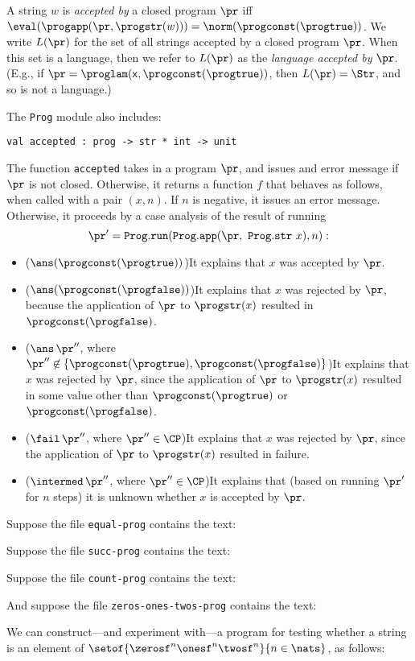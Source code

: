 A string $w$ is \emph{accepted by} a closed program $\pr$ iff
$\eval(\progapp(\pr,\progstr(w))) = \norm(\progconst(\progtrue))$.
We write $L(\pr)$ for the set of all strings accepted by a closed
program $\pr$.  When this set is a language, then we refer to $L(\pr)$
as the \emph{language accepted by} $\pr$.  (E.g., if
$\pr=\proglam(\mathsf{x},\progconst(\progtrue))$, then $L(\pr) =
\Str$, and so is not a language.)

The \texttt{Prog} module also includes:
\begin{verbatim}
val accepted : prog -> str * int -> unit
\end{verbatim}
The function \texttt{accepted} takes in a program $\pr$, and issues
and error message if $\pr$ is not closed.  Otherwise, it returns
a function $f$ that behaves as follows, when called with a pair
$(x, n)$.  If $n$ is negative, it issues an error message.  Otherwise,
it proceeds by a case analysis of the result of running
\begin{displaymath}
  \pr' = \mathtt{Prog.run}(\mathtt{Prog.app}(\pr,~\mathtt{Prog.str}~x), n) :
\end{displaymath}
\begin{itemize}
\item ($\ans(\progconst(\progtrue))$)\quad It explains that
  $x$ was accepted by $\pr$.

\item ($\ans(\progconst(\progfalse))$)\quad It explains that $x$ was
  rejected by $\pr$, because the application of $\pr$ to $\progstr(x)$
  resulted in $\progconst(\progfalse)$.

\item ($\ans\,\pr''$, where $\pr''\not\in\{\progconst(\progtrue),
  \progconst(\progfalse)\}$)\quad It explains that $x$ was rejected by
  $\pr$, since the application of $\pr$ to $\progstr(x)$ resulted in
  some value other than $\progconst(\progtrue)$ or
  $\progconst(\progfalse)$.

\item ($\fail\,\pr''$, where $\pr''\in\CP$)\quad It explains that $x$
  was rejected by $\pr$, since the application of $\pr$ to
  $\progstr(x)$ resulted in failure.

\item ($\intermed\,\pr''$, where $\pr''\in\CP$)\quad It explains that
  (based on running $\pr'$ for $n$ steps) it is unknown whether $x$ is
  accepted by $\pr$.
\end{itemize}

Suppose the file \texttt{equal-prog} contains the text:

Suppose the file \texttt{succ-prog} contains the text:

Suppose the file \texttt{count-prog} contains the text:

And suppose the file \texttt{zeros-ones-twos-prog} contains the
text:

We can construct---and experiment with---a program for testing whether
a string is an element of
$\setof{\zerosf^n\onesf^n\twosf^n}{n\in\nats}$, as follows:


